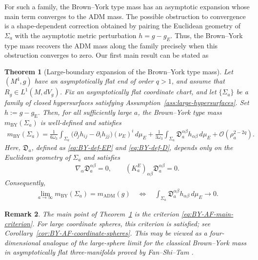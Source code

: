 \documentclass[10pt,a4paper]{amsart}
\newcommand{\gE}{g_{\mathrm{E}}}
\newcommand{\ADM}{\mathrm{ADM}}
\newcommand{\BY}{\mathrm{BY}}
\newtheorem{theorem}{Theorem}[section]
\newtheorem{remark}[theorem]{Remark}
\begin{document}
	For such a family, the Brown--York type mass has an asymptotic expansion whose main term converges to the ADM mass. The possible obstruction to convergence is a shape-dependent correction obtained by pairing the Euclidean geometry of $\Sigma_a$ with the asymptotic metric perturbation $h=g-g_E$. Thus, the Brown--York type mass recovers the ADM mass along the family precisely when this obstruction converges to zero. Our first main result can be stated as
	
	\begin{theorem}[Large-boundary expansion of the Brown--York type mass]
		\label{thm:BY-AF-large-boundary}
		Let $(M^4,g)$ have an asymptotically flat end of order $q>1$, and assume that
		$R_g\in L^1(M,dV_g)$. Fix an asymptotically flat coordinate chart, and let
		$\{\Sigma_a\}$ be a family of closed hypersurfaces satisfying
		Assumption~\ref{ass:large-hypersurfaces}. Set $h:=g-\gE$. Then, for all sufficiently large $a$, the Brown--York type mass
		$m_{\BY}(\Sigma_a)$ is well-defined and satisfies
		\begin{align}\label{eq:BY-AF-main-expansion}
			m_{\BY}(\Sigma_a)
			=
			\frac{1}{6\omega_3}
			\int_{\Sigma_a}
			\bigl(
			\partial_jh_{ij}
			-
			\partial_ih_{jj}
			\bigr)(\nu_E)^i\,d\mu_E
			+
			\frac{1}{3\omega_3}\int_{\Sigma_a}
			\mathfrak D_a^{\alpha\beta}
			h_{\alpha\beta}\,d\mu_E
			+
			\mathcal O(\rho_a^{2-2q}).
		\end{align}
		Here, $\mathfrak D_a$, defined as \eqref{eq:BY-def-EP} and \eqref{eq:BY-def-D}, depends only on the Euclidean geometry of $\Sigma_a$ and satisfies
		\begin{align*}
			\nabla_\alpha\mathfrak D_a^{\alpha\beta}=0,
			\qquad
			(K_a^E)_{\alpha\beta}\mathfrak D_a^{\alpha\beta}=0.
		\end{align*}
		Consequently,
		\begin{align}\label{eq:BY-AF-main-criterion}
			\lim_{a\to\infty}m_{\BY}(\Sigma_a)
			=
			m_{\ADM}(g)
			\quad\Longleftrightarrow\quad
			\int_{\Sigma_a}
			\mathfrak D_a^{\alpha\beta}
			h_{\alpha\beta}\,d\mu_E
			\longrightarrow 0.
		\end{align}
	\end{theorem}
	
	\begin{remark}
		The main point of Theorem~\ref{thm:BY-AF-large-boundary} is the
		criterion \eqref{eq:BY-AF-main-criterion}.  For large coordinate
		spheres, this criterion is satisfied; see
		Corollary~\ref{cor:BY-AF-coordinate-spheres}.  This may be viewed as
		a four-dimensional analogue of the large-sphere limit for the
		classical Brown--York mass in asymptotically flat three-manifolds
		proved by Fan--Shi--Tam \cite{FanShiTam}.
	\end{remark}
	
\end{document}
